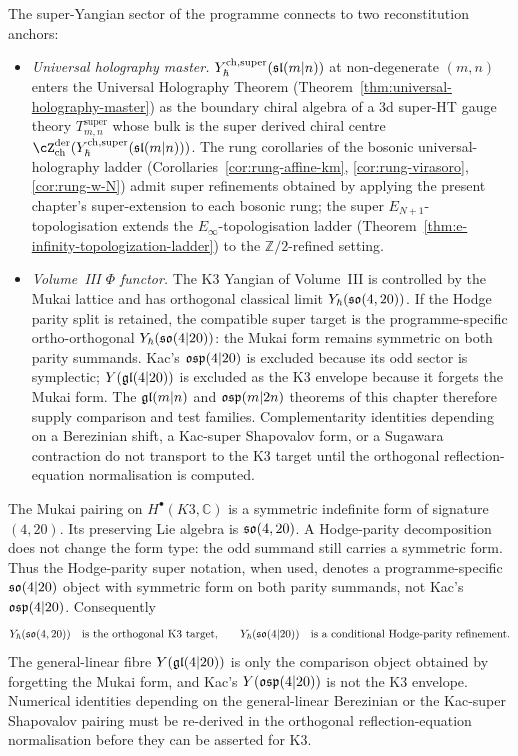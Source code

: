 \begin{remark}
\label{rem:super-climax-anchors}
The super-Yangian sector of the programme connects to two
reconstitution anchors:
\begin{itemize}
\item[(a)] \emph{Universal holography master.}
 $Y^{\mathrm{ch},\mathrm{super}}_{\hbar}(\mathfrak{sl}(m|n))$ at non-degenerate $(m,n)$ enters the
 Universal Holography Theorem
 (Theorem~\ref{thm:universal-holography-master}) as the boundary
 chiral algebra of a 3d super-HT gauge theory
 $T^{\mathrm{super}}_{m,n}$ whose bulk is the super derived chiral
 centre $\cZ^{\mathrm{der}}_{\mathrm{ch}}(\Ysuper_{\hbar}(\fsl(m|n)))$.
 The rung corollaries of the bosonic universal-holography ladder
 (Corollaries~\ref{cor:rung-affine-km}, \ref{cor:rung-virasoro},
 \ref{cor:rung-w-N}) admit super refinements obtained by applying the
 present chapter's super-extension to each bosonic rung; the super
 $E_{N+1}$-topologisation extends the $E_\infty$-topologisation
 ladder (Theorem~\ref{thm:e-infinity-topologization-ladder}) to the
 $\mathbb{Z}/2$-refined setting.
\item[(b)] \emph{Volume~III $\Phi$ functor.} The K3 Yangian of
 Volume~III is controlled by the Mukai lattice and has orthogonal
 classical limit $Y_{\hbar}(\mathfrak{so}(4,20))$. If the Hodge parity split is
 retained, the compatible super target is the programme-specific
 ortho-orthogonal $Y_{\hbar}(\mathfrak{so}(4|20))$: the Mukai form remains
 symmetric on both parity summands. Kac's $\mathfrak{osp}(4|20)$ is excluded
 because its odd sector is symplectic; $Y(\mathfrak{gl}(4|20))$ is excluded as
 the K3 envelope because it forgets the Mukai form. The
 $\mathfrak{gl}(m|n)$ and $\mathfrak{osp}(m|2n)$ theorems of this chapter therefore
 supply comparison and test families. Complementarity identities
 depending on a Berezinian shift, a Kac-super Shapovalov form, or a
 Sugawara contraction do not transport to the K3 target until the
 orthogonal reflection-equation normalisation is computed.
\end{itemize}
\end{remark}

\begin{remark}
\label{rem:vol-iii-osp-rename-caveat}
The Mukai pairing on $H^\bullet(K3,\mathbb{C})$ is a symmetric
indefinite form of signature $(4,20)$. Its preserving Lie algebra is
$\mathfrak{so}(4,20)$. A Hodge-parity decomposition does not change the form
type: the odd summand still carries a symmetric form. Thus the
Hodge-parity super notation, when used, denotes a programme-specific
$\mathfrak{so}(4|20)$ object with symmetric form on both parity summands, not
Kac's $\mathfrak{osp}(4|20)$. Consequently
\[
 Y_{\hbar}(\mathfrak{so}(4,20))
 \quad\text{is the orthogonal K3 target,}
 \qquad
 Y_{\hbar}(\mathfrak{so}(4|20))
 \quad\text{is a conditional Hodge-parity refinement.}
\]
The general-linear fibre $Y(\mathfrak{gl}(4|20))$ is only the comparison object
obtained by forgetting the Mukai form, and Kac's $Y(\mathfrak{osp}(4|20))$ is
not the K3 envelope. Numerical identities depending on the
general-linear Berezinian or the Kac-super Shapovalov pairing must be
re-derived in the orthogonal reflection-equation normalisation before
they can be asserted for K3.
\end{remark}

